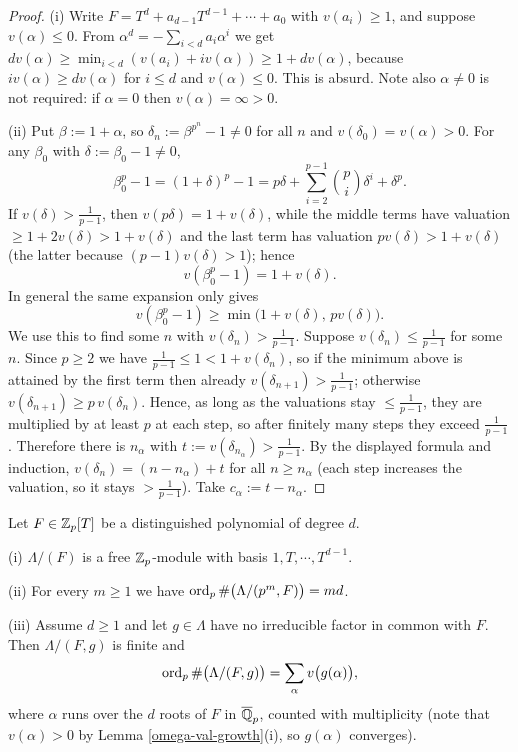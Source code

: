 \begin{proof}
(i) Write $F=T^d+a_{d-1}T^{d-1}+\cdots+a_0$ with $v(a_i)\geq 1$, and suppose
$v(\alpha)\leq 0$. From $\alpha^d=-\sum_{i<d}a_i\alpha^i$ we get
$dv(\alpha)\geq\min_{i<d}(v(a_i)+iv(\alpha))\geq 1+dv(\alpha)$, because
$iv(\alpha)\geq dv(\alpha)$ for $i\leq d$ and $v(\alpha)\leq 0$.
This is absurd. Note also $\alpha\ne0$ is not required: if $\alpha=0$ then
$v(\alpha)=\infty>0$.

(ii) Put $\beta:=1+\alpha$, so $\delta_n:=\beta^{p^n}-1\neq 0$ for all $n$ and
$v(\delta_0)=v(\alpha)>0$. For any $\beta_0$ with $\delta:=\beta_0-1\neq 0$,
$$\beta_0^p-1=(1+\delta)^p-1=p\delta+\sum_{i=2}^{p-1}\binom pi\delta^i+\delta^p .$$
If $v(\delta)>\frac1{p-1}$, then $v(p\delta)=1+v(\delta)$, while the middle terms
have valuation $\geq 1+2v(\delta)>1+v(\delta)$ and the last term has valuation
$pv(\delta)>1+v(\delta)$ (the latter because $(p-1)v(\delta)>1$); hence
$$v(\beta_0^p-1)=1+v(\delta).$$
In general the same expansion only gives
$$v(\beta_0^p-1)\geq\min\big(1+v(\delta),\,pv(\delta)\big).$$
We use this to find some $n$ with $v(\delta_n)>\frac1{p-1}$.
Suppose $v(\delta_n)\leq\frac1{p-1}$ for some $n$.
Since $p\geq 2$ we have $\frac1{p-1}\leq 1<1+v(\delta_n)$, so if the minimum above
is attained by the first term then already $v(\delta_{n+1})>\frac1{p-1}$;
otherwise $v(\delta_{n+1})\geq p\,v(\delta_n)$.
Hence, as long as the valuations stay $\leq\frac1{p-1}$, they are multiplied by
at least $p$ at each step, so after finitely many steps they exceed
$\frac1{p-1}$. Therefore there is $n_\alpha$ with
$t:=v(\delta_{n_\alpha})>\frac1{p-1}$.
By the displayed formula and induction, $v(\delta_n)=(n-n_\alpha)+t$ for all
$n\geq n_\alpha$ (each step increases the valuation, so it stays
$>\frac1{p-1}$). Take $c_\alpha:=t-n_\alpha$.
\end{proof}

\begin{lem}
\label{quotient-by-distinguished}
Let $F\in{\mathbb {Z}}_p[T]$ be a distinguished polynomial of degree $d$.

{\rm(i)} $\Lambda/(F)$ is a free ${\mathbb {Z}}_p$-module with basis
$1,T,\cdots,T^{d-1}$.

{\rm(ii)} For every $m\geq 1$ we have $\operatorname{ord}_p\#\big(\Lambda/(p^m,F)\big)=md$.

{\rm(iii)} Assume $d\geq 1$ and let $g\in\Lambda$ have no irreducible factor in
common with $F$. Then $\Lambda/(F,g)$ is finite and
$$\operatorname{ord}_p\#\big(\Lambda/(F,g)\big)=\sum_{\alpha}v\big(g(\alpha)\big),$$
where $\alpha$ runs over the $d$ roots of $F$ in $\overline{{\mathbb {Q}}}_p$, counted with
multiplicity (note that $v(\alpha)>0$ by Lemma \ref{omega-val-growth}(i), so
$g(\alpha)$ converges).
\end{lem}

